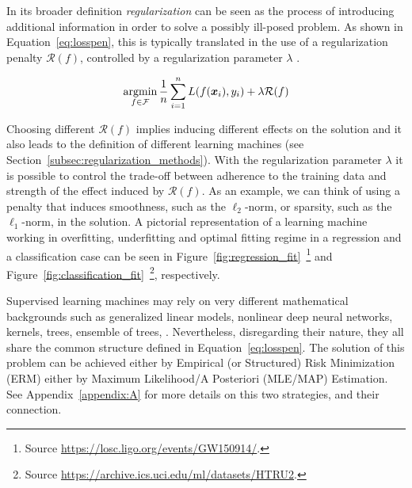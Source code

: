 	    In its broader definition \textit{regularization} can be seen as the process of introducing additional information in order to solve a possibly ill-posed problem.
			As shown in Equation~\eqref{eq:losspen}, this is typically translated in the use of a regularization penalty $\mathcal{R}(f)$, controlled by a regularization parameter $\lambda$ \cite{tikhonov1963solution, evgeniou2000regularization}.

	     \begin{equation}\label{eq:losspen}
	    	\mathop{\mathrm{argmin}}\limits_{f \in \mathcal{F}} \frac{1}{n}\sum_{i=1}^n L(f(\bm{x}_i),y_i) + \lambda \mathcal{R}(f)
	    \end{equation}

			Choosing different $\mathcal{R}(f)$ implies inducing different effects on the solution and it also leads to the definition of different learning machines (see Section~\ref{subsec:regularization_methods}).
			With the regularization parameter $\lambda$ it is possible to control the trade-off between adherence to the training data and strength of the effect induced by $\mathcal{R}(f)$.
			As an example, we can think of using a penalty that induces smoothness, such as the $\ell_2$-norm, or sparsity, such as the $\ell_1$-norm, in the solution.
			A pictorial representation of a learning machine working in overfitting, underfitting and optimal fitting regime in a regression and a classification case can be seen in
			Figure~\ref{fig:regression_fit}~\footnote{ Source \url{https://losc.ligo.org/events/GW150914/}.}
			and
		  Figure~\ref{fig:classification_fit}~\footnote{ Source \url{https://archive.ics.uci.edu/ml/datasets/HTRU2}.}, respectively.



	    Supervised learning machines may rely on very different mathematical backgrounds such as generalized linear models, nonlinear deep neural networks, kernels, trees, ensemble of trees, \etc. Nevertheless, disregarding their nature, they all share the common structure defined in Equation~\eqref{eq:losspen}.
	    The solution of this problem can be achieved either by Empirical (or Structured) Risk Minimization (\ac{ERM}) either by Maximum Likelihood/A Posteriori (\ac{MLE}/\ac{MAP}) Estimation. See Appendix~\ref{appendix:A} for more details on this two strategies, and their connection.

